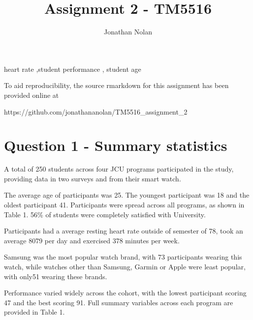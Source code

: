 \documentclass[preprint, 3p,
authoryear]{elsarticle} %
\begin{document}
\begin{frontmatter}

  \title{Assignment 2 - TM5516}
    \author[James Cook University]{Jonathan Nolan%
  }
  
  \begin{abstract}
  
  \end{abstract}
    \begin{keyword}
    heart rate \sep student performance \sep 
    student age
  \end{keyword}
  
 \end{frontmatter}

To aid reproducibility, the source rmarkdown for this assignment has
been provided online at

https://github.com/jonathananolan/TM5516\_assignment\_2

\hypertarget{question-1---summary-statistics}{%
\section{Question 1 - Summary
statistics}\label{question-1---summary-statistics}}

A total of 250 students across four JCU programs participated in the
study, providing data in two surveys and from their smart watch.

The average age of participants was 25. The youngest participant was 18
and the oldest participant 41. Participants were spread across all
programs, as shown in Table 1. 56\% of students were completely
satisfied with University.

Participants had a average resting heart rate outside of semester of 78,
took an average 8079 per day and exercised 378 minutes per week.

Samsung was the most popular watch brand, with 73 participants wearing
this watch, while watches other than Samsung, Garmin or Apple were least
popular, with only51 wearing these brands.

Performance varied widely across the cohort, with the lowest participant
scoring 47 and the best scoring 91. Full summary variables across each
program are provided in Table 1.
\end{document}
